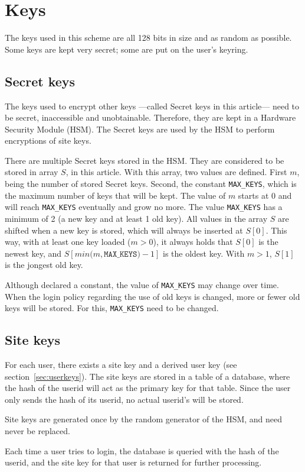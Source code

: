 \section{Keys}
The keys used in this scheme are all 128 bits in size and as random as possible.
Some keys are kept very secret; some are put on the user's keyring.

\subsection{Secret keys}
\label{sec:secret_keys}
The keys used to encrypt other keys%
---called Secret keys in this article---%
need to be secret, inaccessible and unobtainable.
Therefore, they are kept in a Hardware Security Module (HSM).
The Secret keys are used by the HSM to perform  encryptions of site keys.
\par
There are multiple Secret keys stored in the HSM.
They are considered to be stored in array $S$, in this article.
With this array, two values are defined.
First $m$, being the number of stored Secret keys.
Second, the constant \texttt{MAX\_KEYS}, which is the maximum number of keys that will be kept.
The value of $m$ starts at 0 and will reach \texttt{MAX\_KEYS} eventually and grow no more.
The value \texttt{MAX\_KEYS} has a minimum of 2 (a new key and at least 1 old key).
All values in the array $S$ are shifted when a new key is stored, which will always be inserted at $S[0]$.
This way, with at least one key loaded ($m>0$), it always holds that $S[0]$ is the newest key,
and $S[min(m,\mathtt{MAX\_KEYS)} - 1]$ is the oldest key.
With $m>1$, $S[1]$ is the jongest old key.
\par
Although declared a constant, the value of \texttt{MAX\_KEYS} may change over time.
When the login policy regarding the use of old keys is changed, more or fewer old keys will be stored.
For this, \texttt{MAX\_KEYS} need to be changed.

\subsection{Site keys}
For each user, there exists a site key and a derived user key (see section~\ref{sec:userkeys}).
The site keys are stored in a table of a database,
where the  hash of the userid will act as the primary key for that table.
Since the user only sends the  hash of its userid, no actual userid's will be stored.
\par
Site keys are generated once by the random generator of the HSM, and need never be replaced.
\par
Each time a user tries to login,
the database is queried with the  hash of the userid,
and the site key for that user is returned for further processing.

